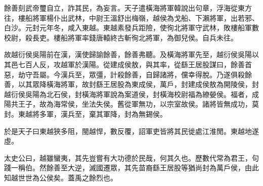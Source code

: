餘善刻武帝璽自立，詐其民，為妄言。天子遣橫海將軍韓說出句章，浮海從東方往，樓船將軍楊仆出武林，中尉王溫舒出梅嶺，越侯為戈船、下瀨將軍，出若邪、白沙。元封元年冬，咸入東越。東越素發兵距險，使徇北將軍守武林，敗樓船軍數校尉，殺長吏。樓船將軍率錢唐轅終古斬徇北將軍，為御兒侯。自兵未往。

故越衍侯吳陽前在漢，漢使歸諭餘善，餘善弗聽。及橫海將軍先至，越衍侯吳陽以其邑七百人反，攻越軍於漢陽。從建成侯敖，與其率，從繇王居股謀曰，餘善首惡，劫守吾屬。今漢兵至，眾彊，計殺餘善，自歸諸將，儻幸得脫。乃遂俱殺餘善，以其眾降橫海將軍，故封繇王居股為東成侯，萬戶，封建成侯敖為開陵侯，封越衍侯吳陽為北石侯，封橫海將軍說為案道侯，封橫海校尉福為繚嫈侯。福者，成陽共王子，故為海常侯，坐法失侯。舊從軍無功，以宗室故侯。諸將皆無成功，莫封。東越將多軍，漢兵至，棄其軍降，封為無錫侯。

於是天子曰東越狹多阻，閩越悍，數反覆，詔軍吏皆將其民徙處江淮閒。東越地遂虛。

太史公曰，越雖蠻夷，其先豈嘗有大功德於民哉，何其久也。歷數代常為君王，句踐一稱伯。然餘善至大逆，滅國遷眾，其先苗裔繇王居股等猶尚封為萬戶侯，由此知越世世為公侯矣。蓋禹之餘烈也。